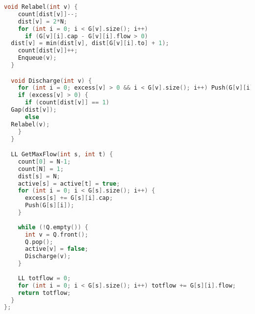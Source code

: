 \begin{lstlisting}[language=C++]
  void Relabel(int v) {
    count[dist[v]]--;
    dist[v] = 2*N;
    for (int i = 0; i < G[v].size(); i++) 
      if (G[v][i].cap - G[v][i].flow > 0)
  dist[v] = min(dist[v], dist[G[v][i].to] + 1);
    count[dist[v]]++;
    Enqueue(v);
  }

  void Discharge(int v) {
    for (int i = 0; excess[v] > 0 && i < G[v].size(); i++) Push(G[v][i]);
    if (excess[v] > 0) {
      if (count[dist[v]] == 1) 
  Gap(dist[v]); 
      else
  Relabel(v);
    }
  }

  LL GetMaxFlow(int s, int t) {
    count[0] = N-1;
    count[N] = 1;
    dist[s] = N;
    active[s] = active[t] = true;
    for (int i = 0; i < G[s].size(); i++) {
      excess[s] += G[s][i].cap;
      Push(G[s][i]);
    }
    
    while (!Q.empty()) {
      int v = Q.front();
      Q.pop();
      active[v] = false;
      Discharge(v);
    }
    
    LL totflow = 0;
    for (int i = 0; i < G[s].size(); i++) totflow += G[s][i].flow;
    return totflow;
  }
};

\end{lstlisting}
